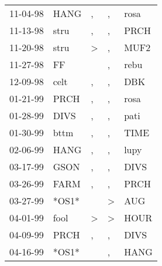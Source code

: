 \begin{supertabular}{p{0.07\textwidth}p{0.06\textwidth}p{0.02\textwidth}p{0.02\textwidth}p{0.06\textwidth}}
 11-04-98\textsuperscript{} &  HANG\textsuperscript{} &                , &             , &           rosa\textsuperscript{} \\
 11-13-98\textsuperscript{} &  stru\textsuperscript{} &                , &             , &           PRCH\textsuperscript{} \\
 11-20-98\textsuperscript{} &  stru\textsuperscript{} &     \textgreater &             , &           MUF2\textsuperscript{} \\
 11-27-98\textsuperscript{} &    FF\textsuperscript{} &                  &             , &           rebu\textsuperscript{} \\
 12-09-98\textsuperscript{} &  celt\textsuperscript{} &                , &             , &            DBK\textsuperscript{} \\
 01-21-99\textsuperscript{} &  PRCH\textsuperscript{} &                , &             , &           rosa\textsuperscript{} \\
 01-28-99\textsuperscript{} &  DIVS\textsuperscript{} &                , &             , &           pati\textsuperscript{} \\
 01-30-99\textsuperscript{} &  bttm\textsuperscript{} &                , &             , &           TIME\textsuperscript{} \\
 02-06-99\textsuperscript{} &  HANG\textsuperscript{} &                , &             , &           lupy\textsuperscript{} \\
 03-17-99\textsuperscript{} &  GSON\textsuperscript{} &                , &             , &           DIVS\textsuperscript{} \\
 03-26-99\textsuperscript{} &  FARM\textsuperscript{} &                , &             , &           PRCH\textsuperscript{} \\
 03-27-99\textsuperscript{} &                   *OS1* &                  &  \textgreater &            AUG\textsuperscript{} \\
 04-01-99\textsuperscript{} &  fool\textsuperscript{} &     \textgreater &  \textgreater &           HOUR\textsuperscript{} \\
 04-09-99\textsuperscript{} &  PRCH\textsuperscript{} &                , &             , &           DIVS\textsuperscript{} \\
 04-16-99\textsuperscript{} &                   *OS1* &                  &             , &           HANG\textsuperscript{} \\

\end{supertabular}
